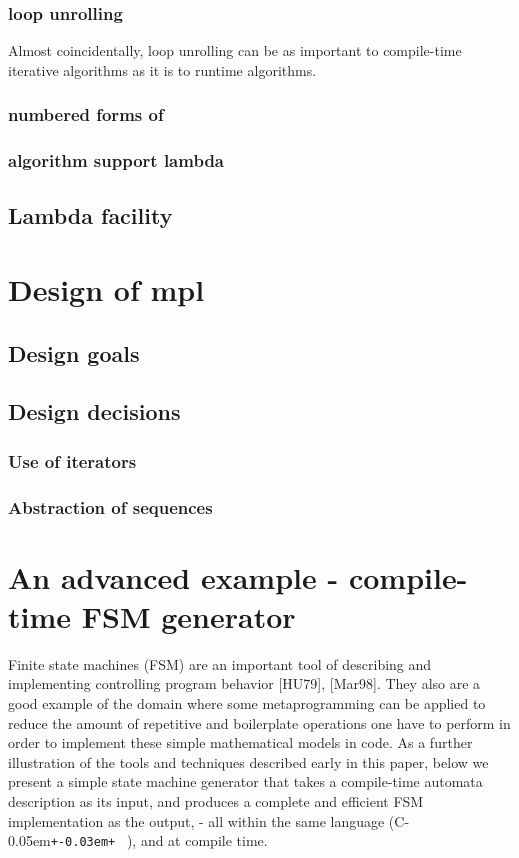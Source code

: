 \documentclass{netobjectdays}
\newcommand{\Cpp}{C\kern-0.05em\texttt{+\kern-0.03em+}%
}
\newcommand{\mping}{meta\-program\-ming}
\begin{document}
  \subsubsection{loop unrolling}

Almost coincidentally, loop unrolling can be as important to
compile-time iterative algorithms as it is to runtime algorithms.

  \subsubsection{numbered forms of }
  \subsubsection{algorithm support lambda}


\subsection{Lambda facility}

\section{Design of mpl}
\subsection{Design goals}
\subsection{Design decisions}
\subsubsection{Use of iterators}
\subsubsection{Abstraction of sequences}

\section{An advanced example - compile-time FSM generator}

Finite state machines (FSM) are an important tool of 
describing and implementing controlling program behavior 
[HU79], [Mar98]. They also are a good example of the domain 
where some \mping{} can be applied to reduce the amount of 
repetitive and boilerplate operations one have to perform 
in order to implement these simple mathematical models in 
code. As a further illustration of the tools and techniques 
described early in this paper, below we present a simple 
state machine generator that takes a compile-time automata 
description as its input, and produces a complete and 
efficient FSM implementation as the output, - all within 
the same language (\Cpp\ ), and at compile time.
\end{document}
